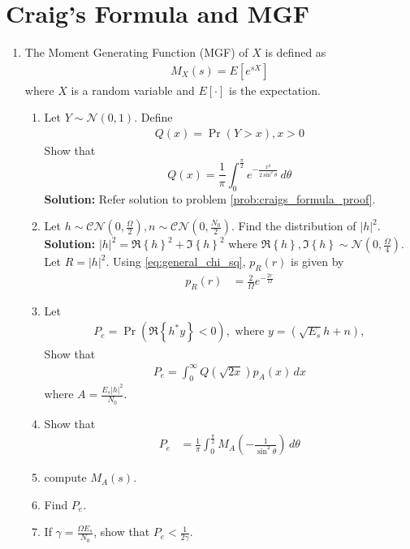 \documentclass[journal,10pt,twocolumn]{IEEEtran}
\providecommand{\pr}[1]{\ensuremath{\Pr\left(#1\right)}}
\providecommand{\qfunc}[1]{\ensuremath{Q\left(#1\right)}}
\providecommand{\sbrak}[1]{\ensuremath{{}\left[#1\right]}}
\providecommand{\brak}[1]{\ensuremath{\left(#1\right)}}
\providecommand{\cbrak}[1]{\ensuremath{\left\{#1\right\}}}
\providecommand{\abs}[1]{\left\vert#1\right\vert}
\newcommand{\solution}{\noindent \textbf{Solution: }}
\providecommand{\gauss}[2]{\mathcal{N}\ensuremath{\left(#1,#2\right)}}
\begin{document}
\section{Craig's Formula and MGF}
\begin{enumerate}
\item
The Moment Generating Function (MGF) of $X$ is defined as
%
\begin{align}
M_{X}(s) = E\sbrak{e^{s X}}
\end{align}
%
where $X$ is a random variable and $E\sbrak{\cdot}$ is the expectation.  
%
%
\begin{enumerate}[label=(\alph{enumii})]
\item Let $Y \sim \gauss{0}{1}$.  Define
%
\begin{align}
Q(x) = \pr{Y > x}, x > 0
\end{align}
%
Show that
\begin{equation}
Q(x) = \frac{1}{\pi}\int^{\frac{\pi}{2}}_{0}e^{-\frac{x^2}{2\sin^2 \theta}}\,d\theta
\end{equation}
\solution Refer solution to problem \ref{prob:craigs_formula_proof}.
\item 
Let $h\sim\mathcal{CN}\brak{0,\frac{\Omega}{2}},n\sim\mathcal{CN}\brak{0,\frac{N_0}{2}}$.  Find the distribution of $\abs{h}^2$.\\
\solution $\abs{h}^2 = \Re\cbrak{h}^2 + \Im\cbrak{h}^2$ where $\Re\cbrak{h}, \Im\cbrak{h} \sim \gauss{0}{\frac{\Omega}{4}}$. Let $R=\abs{h}^2$. %
Using \eqref{eq:general_chi_sq}, $p_R\brak{r}$ is given by
\begin{align}
	p_{R}\brak{r} &= \frac{2}{\Omega}e^{-\frac{2r}{\Omega}}
\end{align}
\item Let
%
\begin{align}
P_e = \pr{\Re \cbrak{h^*y} < 0}, \text{ where } y = \brak{\sqrt{E_s}h + n},
\end{align}
%
Show that
%
\begin{align}
P_e = \int_{0}^{\infty}\qfunc{\sqrt{2x}}p_{A}(x) \,dx
\end{align}
where $A = \frac{E_s\abs{h}^2}{N_0}$.
\item Show that
%
\begin{align}
P_e 
&=  \frac{1}{\pi}\int_{0}^{\frac{\pi}{2}}M_{A}\brak{-\frac{1}{\sin^2\theta}}\,d\theta
\label{ch4_pe_mgf}
\end{align}
%
\item compute $M_A(s)$.
%
\item 
Find $P_e$.
\item 
If $\gamma = \frac{\Omega E_s}{N_0}$, show that $P_e < \frac{1}{2\gamma}$. 
\end{enumerate}
\end{enumerate}
%
\end{document}
